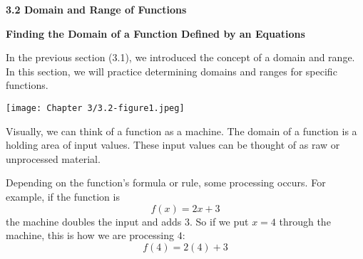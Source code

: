 \documentclass[12pt]{book}
\begin{document}
\begin{comment}
Name: \underline{\hspace{100mm}}
\vspace{20mm}
  \centerline{\Large \textbf{Chapter 2: Equations and Inequalities} } 

{\large
\begin{center}
\begin{varwidth}{\textwidth}
\begin{enumerate}[2.1]
    \item The Regular Coordinate System and Graphs
    \item Linear Equations in One Variable
    \item Models and  Applications (Skipping)
    \item Complex Numbers
    \item Quadratic Equations
    \item Other Types of Equations
    \item Linear Inequalities and Absolute Value Inequalities
\end{enumerate}
\end{varwidth}
\end{center}

}
\newpage  
\end{comment}

\textbf{{\Large 3.2 Domain and Range of Functions}}
\vspace{5mm}



{\large \textbf{Finding the Domain of a Function Defined by an Equations}}
\vspace{3mm}

In the previous section (3.1), we introduced the concept of a domain and range.  In this section, we will practice determining domains and ranges for specific functions. 
\vspace{5mm}



\centerline{\texttt{[image: Chapter 3/3.2-figure1.jpeg]}}

\vspace{3mm}

Visually, we can think of a function as a machine. The domain of a function is a holding area of input values. These input values can be thought of as raw or unprocessed material. 
\vspace{2mm}

Depending on the function's formula or rule, some processing occurs. For example, if the function is $$f(x)= 2x+3$$ the machine doubles the input and adds $3$. So if we put $x=4$ through the machine, this is how we are processing $4$:
$$ f(4)= 2(4) +3 $$
\vspace{2mm}
\end{document}
